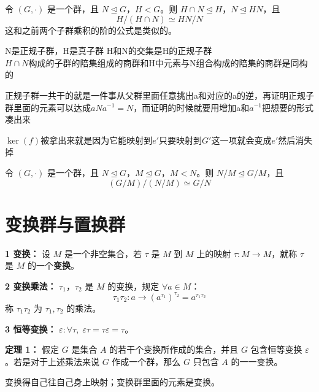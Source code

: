 \begin{theorem}[群同构第二定理（定理 1.3）]
令 $(G,\cdot)$ 是一个群，且 $N\trianglelefteq G$，$H<G$。则 $H\cap N\trianglelefteq H$，$N\trianglelefteq HN$，且
\[
H/(H\cap N)\simeq HN/N
\]
这和之前两个子群乘积的阶的公式是类似的。
\end{theorem}

\begin{note}[群同构第二定理]
N是正规子群，H是真子群 H和N的交集是H的正规子群 \\
$H\cap N$构成的子群的陪集组成的商群和H中元素与N组合构成的陪集的商群是同构的
\end{note}

\begin{note}[证明]
正规子群一共干的就是一件事从父群里面任意挑出a和对应的a的逆，再证明正规子群里面的元素可以达成$aNa^{-1}=N$，而证明的时候就要用增加a和$a^{-1}$把想要的形式凑出来
\end{note}

\begin{note}[证明]
$\ker(f)$被拿出来就是因为它能映射到$e'$只要映射到$G'$这一项就会变成$e'$然后消失掉
\end{note}

\begin{theorem}[群同构第三定理（定理 1.4）]
令 $(G,\cdot)$ 是一个群，且 $N\trianglelefteq G$，$M\trianglelefteq G$，$M<N$。则 $N/M\trianglelefteq G/M$，且
\[
(G/M)/(N/M)\simeq G/N
\]
\end{theorem}

\section{变换群与置换群}

\begin{definition}[变换群]
\textbf{1 变换：} 设 $M$ 是一个非空集合，若 $\tau$ 是 $M$ 到 $M$ 上的映射 $\tau:M\to M$，就称 $\tau$ 是 $M$ 的一个\textbf{变换}。

\textbf{2 变换乘法：} $\tau_1$，$\tau_2$ 是 $M$ 的变换，规定 $\forall a\in M$：
\[
\tau_1\tau_2:a\to(a^{\tau_1})^{\tau_2}=a^{\tau_1\tau_2}
\]
称 $\tau_1\tau_2$ 为 $\tau_1,\tau_2$ 的乘法。

\textbf{3 恒等变换：} $\varepsilon:\forall\tau,\;\varepsilon\tau=\tau\varepsilon=\tau$。

\textbf{定理 1：} 假定 $G$ 是集合 $A$ 的若干个变换所作成的集合，并且 $G$ 包含恒等变换 $\varepsilon$。若是对于上述乘法来说 $G$ 作成一个群，那么 $G$ 只包含 $A$ 的一一变换。

变换得自己往自己身上映射；变换群里面的元素是变换。
\end{definition}

